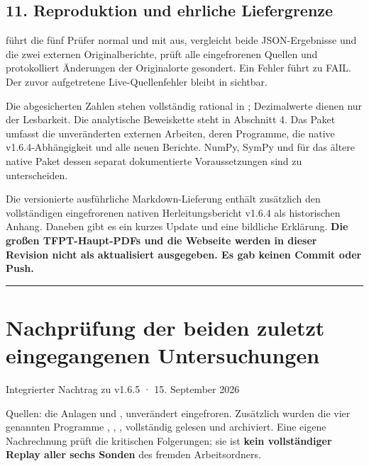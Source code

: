 \subsection{11. Reproduktion und ehrliche
Liefergrenze}\label{reproduktion-und-ehrliche-liefergrenze}

 führt die fünf Prüfer normal und mit
 aus, vergleicht beide JSON-Ergebnisse und die zwei
externen Originalberichte, prüft alle eingefrorenen Quellen und
protokolliert Änderungen der Originalorte gesondert. Ein Fehler führt zu
FAIL. Der zuvor aufgetretene Live-Quellenfehler bleibt in
 sichtbar.

Die abgesicherten Zahlen stehen vollständig rational in
; Dezimalwerte dienen nur der
Lesbarkeit. Die analytische Beweiskette steht in Abschnitt 4. Das Paket
umfasst die unveränderten externen Arbeiten, deren Programme, die native
v1.6.4-Abhängigkeit und alle neuen Berichte. NumPy, SymPy und für das
ältere native Paket dessen separat dokumentierte Voraussetzungen sind zu
unterscheiden.

Die versionierte ausführliche Markdown-Lieferung enthält zusätzlich den
vollständigen eingefrorenen nativen Herleitungsbericht v1.6.4 als
historischen Anhang. Daneben gibt es ein kurzes Update und eine
bildliche Erklärung. \textbf{Die großen TFPT-Haupt-PDFs und die Webseite
werden in dieser Revision nicht als aktualisiert ausgegeben. Es gab
keinen Commit oder Push.}

\begin{center}\rule{0.5\linewidth}{0.5pt}\end{center}

\section{Nachprüfung der beiden zuletzt eingegangenen
Untersuchungen}\label{nachpruxfcfung-der-beiden-zuletzt-eingegangenen-untersuchungen}

Integrierter Nachtrag zu v1.6.5 · 15. September 2026

Quellen: die Anlagen  und
, unverändert
eingefroren. Zusätzlich wurden die vier genannten Programme
, ,
,  vollständig gelesen
und archiviert. Eine eigene Nachrechnung prüft die kritischen
Folgerungen; sie ist \textbf{kein vollständiger Replay aller sechs
Sonden} des fremden Arbeitsordners.

